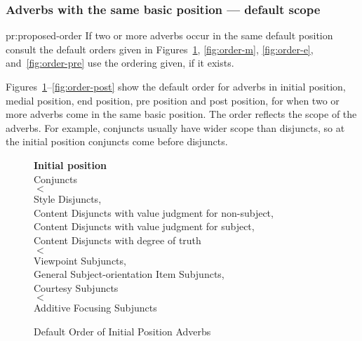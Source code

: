 \subsubsection{Adverbs with the same basic position --- default scope}
\label{subsubsec:order}

\begin{pr}{pr:proposed-order}{}
    If two or more adverbs occur in the same default position
    consult the default orders given in Figures~\ref{fig:order-i},
    \ref{fig:order-m}, \ref{fig:order-e}, and~\ref{fig:order-pre}
    use the ordering given, if it exists.
\end{pr}

Figures~\ref{fig:order-i}--\ref{fig:order-post} show the default order
for adverbs in initial position, medial position, end position, pre
position and post position, for when two or more adverbs
come in the same basic position.  
The order reflects the scope of the adverbs. For example, conjuncts
usually have wider scope than disjuncts, so at the initial position
conjuncts come before disjuncts.

\begin{singlespace}    
\begin{figure}[htbp]
    \small
    {\bf Initial position} \\
    \hspace*{2cm} Conjuncts \\
    \hspace*{2cm} $<$ \\
    \hspace*{2cm} Style Disjuncts, \\
    \hspace*{2cm} Content Disjuncts with value judgment for non-subject, \\
    \hspace*{2cm} Content Disjuncts with value judgment for subject, \\
    \hspace*{2cm} Content Disjuncts with degree of truth \\
    \hspace*{2cm} $<$ \\
    \hspace*{2cm} Viewpoint Subjuncts, \\
    \hspace*{2cm} General Subject-orientation Item Subjuncts, \\
    \hspace*{2cm} Courtesy Subjuncts \\
    \hspace*{2cm} $<$ \\
    \hspace*{2cm} Additive Focusing Subjuncts
  \caption{Default Order of Initial Position Adverbs}
  \label{fig:order-i}
  \vspace*{-5mm}
\end{figure}
  \end{singlespace}

